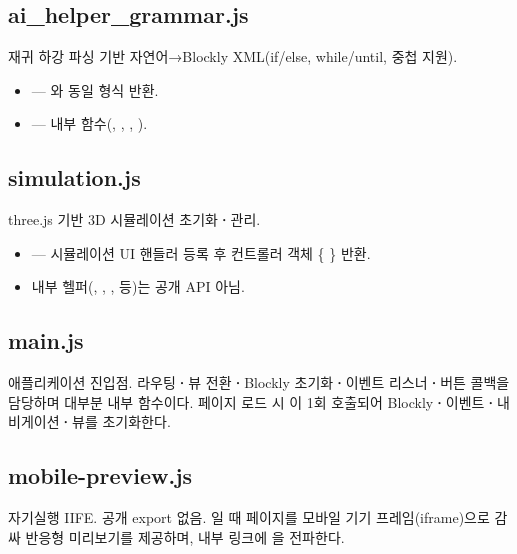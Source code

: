 \subsection{ai\_helper\_grammar.js}

재귀 하강 파싱 기반 자연어→Blockly XML(if/else, while/until, 중첩 지원).
\begin{itemize}
  \item {} --- 와 동일 형식 반환.
  \item {} --- 내부 함수(, ,
        , ).
\end{itemize}

\subsection{simulation.js}

three.js 기반 3D 시뮬레이션 초기화\textbf{·}관리.
\begin{itemize}
  \item {} --- 시뮬레이션
        UI 핸들러 등록 후 컨트롤러 객체 \{  \} 반환.
  \item 내부 헬퍼(, , ,
         등)는 공개 API 아님.
\end{itemize}

\subsection{main.js}

애플리케이션 진입점. 라우팅\textbf{·}뷰 전환\textbf{·}Blockly 초기화\textbf{·}이벤트
리스너\textbf{·}버튼 콜백을 담당하며 대부분 내부 함수이다. 페이지 로드 시
이 1회 호출되어 Blockly\textbf{·}이벤트\textbf{·}내비게이션\textbf{·}뷰를
초기화한다.

\subsection{mobile-preview.js}

자기실행 IIFE. 공개 export 없음. 일 때 페이지를 모바일
기기 프레임(iframe)으로 감싸 반응형 미리보기를 제공하며, 내부 링크에
을 전파한다.
